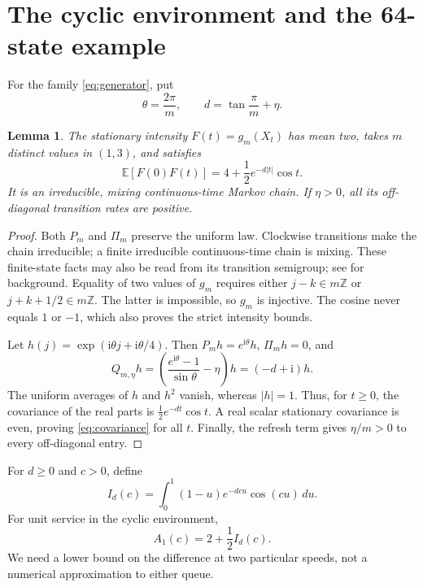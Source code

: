 \documentclass[11pt,reqno]{amsart}
\numberwithin{equation}{section}
\theoremstyle{plain}
\newtheorem{lemma}[theorem]{Lemma}
\theoremstyle{definition}
\newcommand{\E}{\mathbb E}
\newcommand{\Z}{\mathbb Z}
\newcommand{\1}{\mathbf 1}
\newcommand{\ii}{\mathrm i}
\begin{document}
\section{The cyclic environment and the 64-state example}\label{sec:cycle}
For the family \eqref{eq:generator}, put
\begin{equation}\label{eq:delta}
 \theta=\frac{2\pi}{m},\qquad d=\tan\frac\pi m+\eta.
\end{equation}
\begin{lemma}\label{lem:cycle}
The stationary intensity $F(t)=g_m(X_t)$ has mean two, takes $m$ distinct values in $(1,3)$, and satisfies
\begin{equation}\label{eq:covariance}
 \E[F(0)F(t)]=4+\frac12e^{-d|t|}\cos t.
\end{equation}
It is an irreducible, mixing continuous-time Markov chain. If $\eta>0$, all its off-diagonal transition rates are positive.
\end{lemma}
\begin{proof}
Both $P_m$ and $\Pi_m$ preserve the uniform law. Clockwise transitions make the chain irreducible; a finite irreducible continuous-time chain is mixing. These finite-state facts may also be read from its transition semigroup; see \cite{Norris97} for background. Equality of two values of $g_m$ requires either $j-k\in m\Z$ or $j+k+1/2\in m\Z$. The latter is impossible, so $g_m$ is injective. The cosine never equals $1$ or $-1$, which also proves the strict intensity bounds.

Let $h(j)=\exp(\ii\theta j+\ii\theta/4)$. Then $P_mh=e^{\ii\theta}h$, $\Pi_mh=0$, and
\[
 Q_{m,\eta}h=\left(\frac{e^{\ii\theta}-1}{\sin\theta}-\eta\right)h=(-d+\ii)h.
\]
The uniform averages of $h$ and $h^2$ vanish, whereas $|h|=1$. Thus, for $t\ge0$, the covariance of the real parts is $\tfrac12e^{-dt}\cos t$. A real scalar stationary covariance is even, proving \eqref{eq:covariance} for all $t$. Finally, the refresh term gives $\eta/m>0$ to every off-diagonal entry.
\end{proof}
For $d\ge0$ and $c>0$, define
\begin{equation}\label{eq:Id}
 I_d(c)=\int_0^1(1-u)e^{-dcu}\cos(cu)\,du.
\end{equation}
For unit service in the cyclic environment,
\begin{equation}\label{eq:Aunit}
 A_1(c)=2+\frac12I_d(c).
\end{equation}
We need a lower bound on the difference at two particular speeds, not a numerical approximation to either queue.
\end{document}
